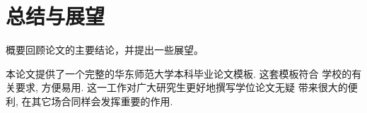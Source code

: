 
\chapter{总结与展望}\label{chap2}

概要回顾论文的主要结论，并提出一些展望。

本论文提供了一个完整的华东师范大学本科毕业论文模板. 这套模板符合
学校的有关要求, 方便易用. 这一工作对广大研究生更好地撰写学位论文无疑
带来很大的便利, 在其它场合同样会发挥重要的作用. 